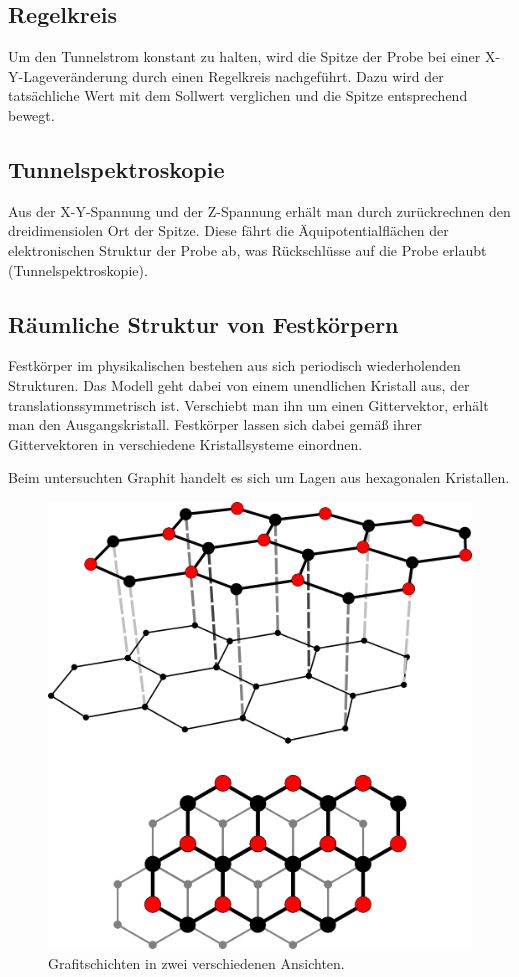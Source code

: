 \documentclass[a4paper,german,12pt,smallheadings]{scrartcl}
\begin{document}
\subsection{Regelkreis}

Um den Tunnelstrom konstant zu halten, wird die Spitze der Probe bei einer
X-Y-Lageveränderung durch einen Regelkreis nachgeführt. Dazu wird der
tatsächliche Wert mit dem Sollwert verglichen und die Spitze entsprechend
bewegt.

\subsection{Tunnelspektroskopie}

Aus der X-Y-Spannung und der Z-Spannung erhält man durch zurückrechnen den
dreidimensiolen Ort der Spitze. Diese fährt die Äquipotentialflächen der
elektronischen Struktur der Probe ab, was Rückschlüsse auf die Probe erlaubt
(Tunnelspektroskopie).

\subsection{Räumliche Struktur von Festkörpern}

Festkörper im physikalischen bestehen aus sich periodisch wiederholenden
Strukturen. Das Modell geht dabei von einem unendlichen Kristall aus, der
translationssymmetrisch ist. Verschiebt man ihn um einen Gittervektor, erhält
man den Ausgangskristall. Festkörper lassen sich dabei gemäß ihrer
Gittervektoren in verschiedene Kristallsysteme einordnen.

Beim untersuchten Graphit handelt es sich um Lagen aus hexagonalen Kristallen.

\begin{figure}[h!]
  \centering
  \includegraphics[width=0.6 \textwidth]{pic3.png}
  \caption{Grafitschichten in zwei verschiedenen Ansichten.\citep{pic3}}
\end{figure}
\end{document}

